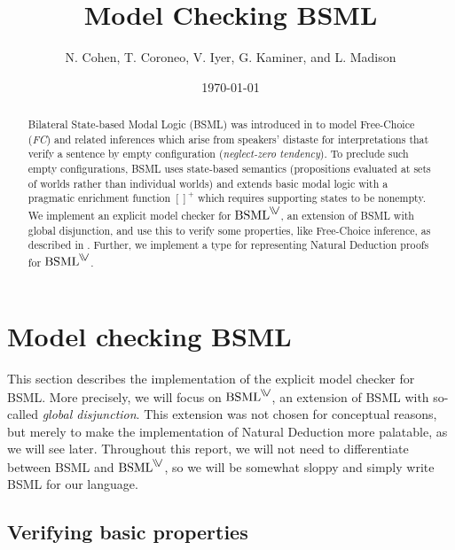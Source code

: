 \documentclass[11pt,a4paper]{article}
\title{Model Checking BSML}
\author{N. Cohen, T. Coroneo, V. Iyer, G. Kaminer, and L. Madison}
\date{\today}
\begin{document}
\maketitle

\begin{abstract}
Bilateral State-based Modal Logic (BSML) was introduced in \cite{Aloni2022} to model Free-Choice (\textit{FC}) and related inferences which arise from speakers' distaste for
interpretations that verify a sentence by empty configuration (\textit{neglect-zero tendency}). To preclude such empty configurations, BSML uses state-based semantics (propositions evaluated at sets of worlds rather than individual worlds) and extends basic modal logic with a pragmatic enrichment function $[]^+$ which requires supporting states to be nonempty.
We implement an explicit model checker for $\mathrm{BSML}^{\gor}$, an extension of BSML with global disjunction, and use this to verify some properties, like Free-Choice inference, as described in \cite{Aloni2024}.
Further, we implement a type for representing Natural Deduction proofs for $\mathrm{BSML}^{\gor}$.
\end{abstract}

\setcounter{tocdepth}{1}
\tableofcontents

\clearpage



\section{Model checking BSML}\label{sec:BSML}

This section describes the implementation of the explicit model checker for BSML. 
More precisely, we will focus on $\mathrm{BSML}^{\gor}$, an extension of BSML with so-called \emph{global disjunction}. 
This extension was not chosen for conceptual reasons, but merely to make the implementation of Natural Deduction more palatable, as we will see later. 
Throughout this report, we will not need to differentiate between BSML and $\mathrm{BSML}^{\gor}$, so we will be somewhat sloppy and simply write BSML for our language. 







\subsection{Verifying basic properties}
\end{document}
